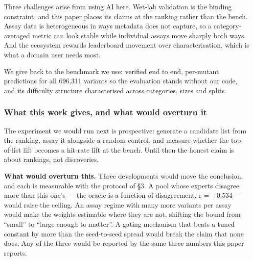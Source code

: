 \documentclass{article}
\begin{document}
Three challenges arise from using AI here. Wet-lab validation is the binding constraint, and this paper places its
claims at the ranking rather than the bench. Assay data is heterogeneous in ways metadata does not capture, so a
category-averaged metric can look stable while individual assays move sharply both ways. And the ecosystem rewards
leaderboard movement over characterisation, which is what a domain user needs most.

We give back to the benchmark we use: verified end to end, per-mutant predictions for all 696,311 variants so the
evaluation stands without our code, and its difficulty structure characterised across categories, sizes and splits.

\subsubsection*{What this work gives, and what would overturn it}\label{what-this-work-gives-and-what-would-overturn-it}

The experiment we would run next is prospective: generate a candidate list from the ranking, assay it
alongside a random control, and measure whether the top-of-list lift becomes a hit-rate lift at the bench.
Until then the honest claim is about rankings, not discoveries.

\textbf{What would overturn this.} Three developments would move the conclusion, and each is measurable with the
protocol of §3. A pool whose experts disagree more than this one's --- the oracle is a function of
disagreement, r = +0.534 --- would raise the ceiling. An assay regime with many more variants per assay would
make the weights estimable where they are not, shifting the bound from ``small'' to ``large enough to matter''. A
gating mechanism that beats a tuned constant by more than the seed-to-seed spread would break the claim that
none does. Any of the three would be reported by the same three numbers this paper reports.




\end{document}
